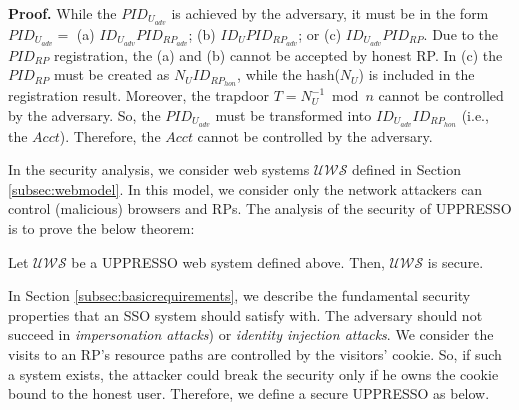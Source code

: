 \noindent\textbf{Proof. }
While the $PID_{U_{adv}}$ is achieved by the adversary, it must be in the form $PID_{U_{adv}}=$ (a) $ID_{U_{adv}}PID_{RP_{adv}}$; (b) $ID_{U}PID_{RP_{adv}}$; or (c) $ID_{U_{adv}}PID_{RP}$.
 Due to the $PID_{RP}$ registration, the (a) and (b) cannot be accepted by honest RP. In (c) the $PID_{RP}$ must be created as $N_UID_{RP_{hon}}$, while the hash($N_U$) is included in the registration result. Moreover, the trapdoor $T=N_U^{-1} \bmod n$ cannot be controlled by the adversary. So, the $PID_{U_{adv}}$ must be transformed into $ID_{U_{adv}}ID_{RP_{hon}}$ (i.e., the $Acct$). Therefore, the $Acct$ cannot be controlled by the adversary.

In the security analysis, we consider web systems $\mathcal{UWS}$ defined in Section \ref{subsec:webmodel}.
In this model, we consider only
the network attackers can control (malicious) browsers and RPs.
The analysis of the security of UPPRESSO is to prove the below theorem:
\vspace{-\topsep}
\begin{theorem}
Let $\mathcal{UWS}$ be a UPPRESSO web system defined above. Then, $\mathcal{UWS}$ is secure.
\label{the:secure}
\end{theorem}
\vspace{-\topsep}
In Section \ref{subsec:basicrequirements}, we describe the fundamental security properties that an SSO system should satisfy with.  The adversary should not succeed in \emph{impersonation attacks}) or \emph{identity injection attacks}.
We consider the visits to an RP's resource paths are controlled by the visitors' cookie. So, if such a system exists, the attacker could break the security only if he owns the cookie bound to the honest user.
Therefore, we define a secure UPPRESSO as below.

